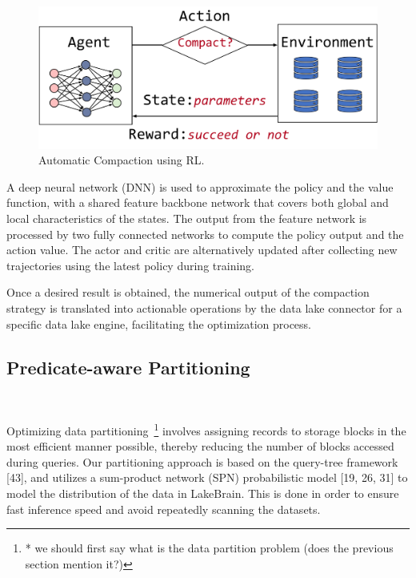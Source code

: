\begin{figure}[htbp]
	\includegraphics[scale=0.35]{figures/rl}
	\centering
	\vspace{-1em}
	\caption{Automatic Compaction using RL.}
	\label{fig:rl}
	\vspace{-1em}
\end{figure}

A deep neural network (DNN) is used to approximate the policy and the value function, with a shared feature backbone network that covers both global and local characteristics of the states. The output from the feature network is processed by two fully connected networks to compute the policy output and the action value. The actor and critic are alternatively updated after collecting new trajectories using the latest policy during training.

Once a desired result is obtained, the numerical output of the compaction strategy is translated into actionable operations by the data lake connector for a specific data lake engine, facilitating the optimization process.





\subsection{Predicate-aware Partitioning}~\label{subsec:partition}

Optimizing data partitioning~\footnote{* we should first say what is the data partition problem (does the previous section mention it?)} involves assigning records to storage blocks in the most efficient manner possible, thereby reducing the number of blocks accessed during queries. Our partitioning approach is based on the query-tree framework [43], and utilizes a sum-product network (SPN) probabilistic model [19, 26, 31] to model the distribution of the data in LakeBrain. This is done in order to ensure fast inference speed and avoid repeatedly scanning the datasets.

